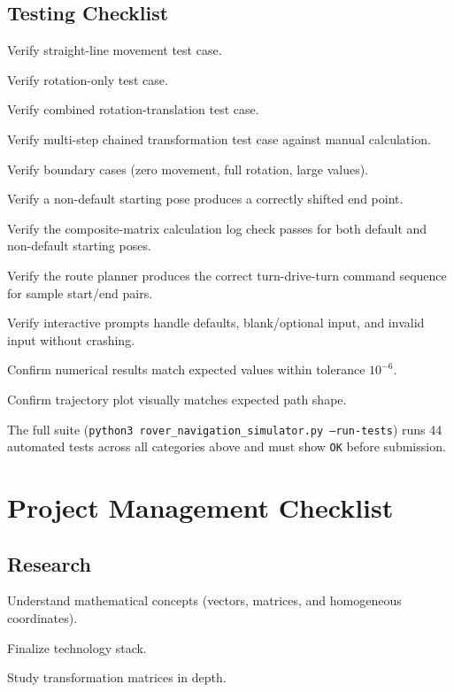 \documentclass[12pt]{report}
\begin{document}
\section{Testing Checklist}
\enlargethispage{2\baselineskip}
\begin{checklist}
\item Verify straight-line movement test case.
\item Verify rotation-only test case.
\item Verify combined rotation-translation test case.
\item Verify multi-step chained transformation test case against manual calculation.
\item Verify boundary cases (zero movement, full rotation, large values).
\item Verify a non-default starting pose produces a correctly shifted end point.
\item Verify the composite-matrix calculation log check passes for both default and non-default starting poses.
\item Verify the route planner produces the correct turn-drive-turn command sequence for sample start/end pairs.
\item Verify interactive prompts handle defaults, blank/optional input, and invalid input without crashing.
\item Confirm numerical results match expected values within tolerance $10^{-6}$.
\item Confirm trajectory plot visually matches expected path shape.
\end{checklist}
\begin{infobox}[title=Current Automated Test Count]
The full suite (\texttt{python3 rover\_navigation\_simulator.py --run-tests}) runs 44 automated tests across all categories above and must show \texttt{OK} before submission.
\end{infobox}

\chapter{Project Management Checklist}

\section{Research}
\begin{checklist}
\item Understand mathematical concepts (vectors, matrices, and homogeneous coordinates).
\item Finalize technology stack.
\item Study transformation matrices in depth.
\end{checklist}
\end{document}
